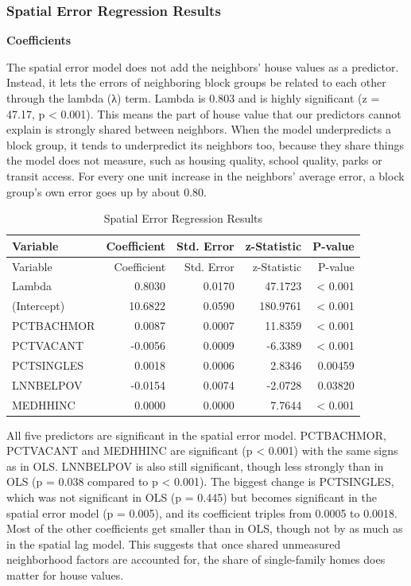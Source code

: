 \documentclass[
  12pt,
]{article}
\begin{document}
\subsubsection{Spatial Error Regression
Results}\label{spatial-error-regression-results}

\textbf{Coefficients}

The spatial error model does not add the neighbors' house values as a
predictor. Instead, it lets the errors of neighboring block groups be
related to each other through the lambda (λ) term. Lambda is 0.803 and
is highly significant (z = 47.17, p \textless{} 0.001). This means the
part of house value that our predictors cannot explain is strongly
shared between neighbors. When the model underpredicts a block group, it
tends to underpredict its neighbors too, because they share things the
model does not measure, such as housing quality, school quality, parks
or transit access. For every one unit increase in the neighbors' average
error, a block group's own error goes up by about 0.80.

\begin{longtable}[]{@{}lrrrr@{}}
\caption{Spatial Error Regression Results}\tabularnewline
\toprule\noalign{}
Variable & Coefficient & Std. Error & z-Statistic & P-value \\
\midrule\noalign{}
\endfirsthead
\toprule\noalign{}
Variable & Coefficient & Std. Error & z-Statistic & P-value \\
\midrule\noalign{}
\endhead
\bottomrule\noalign{}
\endlastfoot
Lambda & 0.8030 & 0.0170 & 47.1723 & \textless{} 0.001 \\
(Intercept) & 10.6822 & 0.0590 & 180.9761 & \textless{} 0.001 \\
PCTBACHMOR & 0.0087 & 0.0007 & 11.8359 & \textless{} 0.001 \\
PCTVACANT & -0.0056 & 0.0009 & -6.3389 & \textless{} 0.001 \\
PCTSINGLES & 0.0018 & 0.0006 & 2.8346 & 0.00459 \\
LNNBELPOV & -0.0154 & 0.0074 & -2.0728 & 0.03820 \\
MEDHHINC & 0.0000 & 0.0000 & 7.7644 & \textless{} 0.001 \\
\end{longtable}

All five predictors are significant in the spatial error model.
PCTBACHMOR, PCTVACANT and MEDHHINC are significant (p \textless{} 0.001)
with the same signs as in OLS. LNNBELPOV is also still significant,
though less strongly than in OLS (p = 0.038 compared to p \textless{}
0.001). The biggest change is PCTSINGLES, which was not significant in
OLS (p = 0.445) but becomes significant in the spatial error model (p =
0.005), and its coefficient triples from 0.0005 to 0.0018. Most of the
other coefficients get smaller than in OLS, though not by as much as in
the spatial lag model. This suggests that once shared unmeasured
neighborhood factors are accounted for, the share of single-family homes
does matter for house values.
\end{document}

